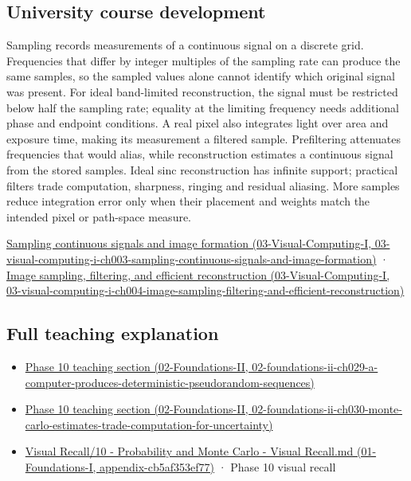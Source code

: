 \subsection{University course development}\label{appendix-6a7869dd79a6-university-course-development}

Sampling records measurements of a continuous signal on a discrete grid. Frequencies that differ by integer multiples of the sampling rate can produce the same samples, so the sampled values alone cannot identify which original signal was present. For ideal band-limited reconstruction, the signal must be restricted below half the sampling rate; equality at the limiting frequency needs additional phase and endpoint conditions. A real pixel also integrates light over area and exposure time, making its measurement a filtered sample. Prefiltering attenuates frequencies that would alias, while reconstruction estimates a continuous signal from the stored samples. Ideal sinc reconstruction has infinite support; practical filters trade computation, sharpness, ringing and residual aliasing. More samples reduce integration error only when their placement and weights match the intended pixel or path-space measure.

\href{../03-Visual-Computing-I/main.pdf\#nameddest=03-visual-computing-i-ch003-sampling-continuous-signals-and-image-formation}{Sampling continuous signals and image formation (03-Visual-Computing-I, 03-visual-computing-i-ch003-sampling-continuous-signals-and-image-formation)} · \href{../03-Visual-Computing-I/main.pdf\#nameddest=03-visual-computing-i-ch004-image-sampling-filtering-and-efficient-reconstruction}{Image sampling, filtering, and efficient reconstruction (03-Visual-Computing-I, 03-visual-computing-i-ch004-image-sampling-filtering-and-efficient-reconstruction)}

\subsection{Full teaching explanation}\label{appendix-6a7869dd79a6-full-teaching-explanation}

\begin{itemize}
\tightlist
\item
  \href{../02-Foundations-II/main.pdf\#nameddest=02-foundations-ii-ch029-a-computer-produces-deterministic-pseudorandom-sequences}{Phase 10 teaching section (02-Foundations-II, 02-foundations-ii-ch029-a-computer-produces-deterministic-pseudorandom-sequences)}
\item
  \href{../02-Foundations-II/main.pdf\#nameddest=02-foundations-ii-ch030-monte-carlo-estimates-trade-computation-for-uncertainty}{Phase 10 teaching section (02-Foundations-II, 02-foundations-ii-ch030-monte-carlo-estimates-trade-computation-for-uncertainty)}
\item
  \href{../01-Foundations-I/main.pdf\#nameddest=appendix-cb5af353ef77}{Visual Recall/10 - Probability and Monte Carlo - Visual Recall.md (01-Foundations-I, appendix-cb5af353ef77)} · Phase 10 visual recall
\end{itemize}
